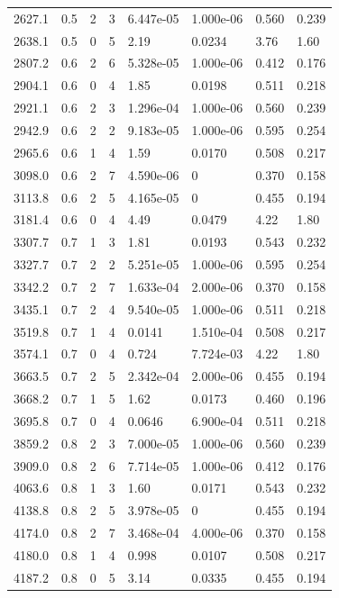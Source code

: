 \documentclass[preview]{standalone}
\begin{document}
{{{\begin{tabular}{L{1.2cm}C{1.2cm} C{0.3cm}C{0.5cm} C{1.4cm}C{1.4cm} C{1.4cm}C{1.4cm}}
  2627.1  &   0.5  & 2     &  3 &  6.447e-05  & 1.000e-06  & 0.560 &  0.239   \\ 
  2638.1  &   0.5  & 0     &  5 &  2.19  & 0.0234  & 3.76 &  1.60   \\ 
  2807.2  &   0.6  & 2     &  6 &  5.328e-05  & 1.000e-06  & 0.412 &  0.176   \\ 
  2904.1  &   0.6  & 0     &  4 &  1.85  & 0.0198  & 0.511 &  0.218   \\ 
  2921.1  &   0.6  & 2     &  3 &  1.296e-04  & 1.000e-06  & 0.560 &  0.239   \\ 
  2942.9  &   0.6  & 2     &  2 &  9.183e-05  & 1.000e-06  & 0.595 &  0.254   \\ 
  2965.6  &   0.6  & 1     &  4 &  1.59  & 0.0170  & 0.508 &  0.217   \\ 
  3098.0  &   0.6  & 2     &  7 &  4.590e-06  & 0  & 0.370 &  0.158   \\ 
  3113.8  &   0.6  & 2     &  5 &  4.165e-05  & 0  & 0.455 &  0.194   \\ 
  3181.4  &   0.6  & 0     &  4 &  4.49  & 0.0479  & 4.22 &  1.80   \\ 
  3307.7  &   0.7  & 1     &  3 &  1.81  & 0.0193  & 0.543 &  0.232   \\ 
  3327.7  &   0.7  & 2     &  2 &  5.251e-05  & 1.000e-06  & 0.595 &  0.254   \\ 
  3342.2  &   0.7  & 2     &  7 &  1.633e-04  & 2.000e-06  & 0.370 &  0.158   \\ 
  3435.1  &   0.7  & 2     &  4 &  9.540e-05  & 1.000e-06  & 0.511 &  0.218   \\ 
  3519.8  &   0.7  & 1     &  4 &  0.0141  & 1.510e-04  & 0.508 &  0.217   \\ 
  3574.1  &   0.7  & 0     &  4 &  0.724  & 7.724e-03  & 4.22 &  1.80   \\ 
  3663.5  &   0.7  & 2     &  5 &  2.342e-04  & 2.000e-06  & 0.455 &  0.194   \\ 
  3668.2  &   0.7  & 1     &  5 &  1.62  & 0.0173  & 0.460 &  0.196   \\ 
  3695.8  &   0.7  & 0     &  4 &  0.0646  & 6.900e-04  & 0.511 &  0.218   \\ 
  3859.2  &   0.8  & 2     &  3 &  7.000e-05  & 1.000e-06  & 0.560 &  0.239   \\ 
  3909.0  &   0.8  & 2     &  6 &  7.714e-05  & 1.000e-06  & 0.412 &  0.176   \\ 
  4063.6  &   0.8  & 1     &  3 &  1.60  & 0.0171  & 0.543 &  0.232   \\ 
  4138.8  &   0.8  & 2     &  5 &  3.978e-05  & 0  & 0.455 &  0.194   \\ 
  4174.0  &   0.8  & 2     &  7 &  3.468e-04  & 4.000e-06  & 0.370 &  0.158   \\ 
  4180.0  &   0.8  & 1     &  4 &  0.998  & 0.0107  & 0.508 &  0.217   \\ 
  4187.2  &   0.8  & 0     &  5 &  3.14  & 0.0335  & 0.455 &  0.194   \\ 
\hline 
\end{tabular} 

}}}
\end{document}
